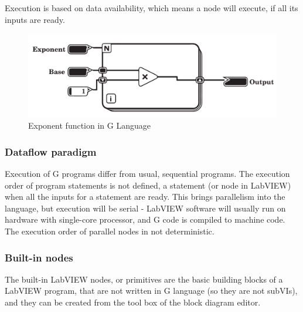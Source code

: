 Execution is based on data availability, which means a node will execute, if all its inputs are ready. 
\begin{figure}

\includegraphics[width=150mm,keepaspectratio]{figures/vi2.pdf}
\caption{Exponent function in G Language} 
\label{fig:gexponent}
\end{figure}

\subsubsection{Dataflow paradigm}
Execution of G programs differ from usual, sequential programs. The execution order of program statements is not defined, a statement (or node in LabVIEW) when all the inputs for a statement are ready. This brings parallelism into the language, but execution will be serial - LabVIEW software will usually run on hardware with single-core processor, and G code is compiled to machine code. \cite{labview_under_the_hood} The execution order of parallel nodes in not deterministic. 
\subsubsection{Built-in nodes}
The built-in LabVIEW nodes, or primitives are the basic building blocks of a LabVIEW program, that are not written in G language (so they are not subVIs), and they can be created from the tool box of the block diagram editor.

